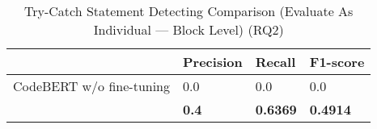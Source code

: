 \begin{table}[t]%
\caption{Try-Catch Statement Detecting Comparison (Evaluate {\xstate} As Individual --- Block Level) (RQ2)}
  \vspace{-12pt}
  \small
	\begin{center}
		\renewcommand{\arraystretch}{1}
		\begin{tabular}{| p{3.05cm}<{\centering} | p{1.2cm}<{\centering} | p{1.2cm}<{\centering}| p{1.2cm}<{\centering}|}
		  \hline
			  & Precision  & Recall & F1-score \\
			\hline
			CodeBERT w/o fine-tuning &  0.0 & 0.0  & 0.0\\
			\hline
			\tool   & \textbf{0.4}  &  \textbf{0.6369} & \textbf{0.4914}\\
			\hline
		\end{tabular}
		\label{tab:xstate-2}
	\end{center}
\end{table}

